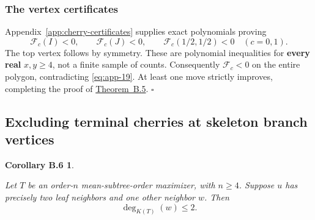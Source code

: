 \documentclass[11pt,reqno]{amsart}
\theoremstyle{plain}
\newtheorem*{appcorollarysix}{Corollary B.6}
\begin{document}
\subsubsection*{The vertex certificates}\label{the-vertex-certificates}

Appendix~\ref{app:cherry-certificates} supplies exact polynomials proving \[
\mathcal F_c(I)<0,\qquad
\mathcal F_c(J)<0,\qquad
\mathcal F_c(1/2,1/2)<0
\quad(c=0,1).
\tag{B.25}\label{eq:app-25}
\] The top vertex follows by symmetry. These are polynomial inequalities for \textbf{every real} \(x,y\ge4\), not a finite sample of counts. Consequently \(\mathcal F_c<0\) on the entire polygon, contradicting \eqref{eq:app-19}. At least one move strictly improves, completing the proof of \hyperref[thm:app-5]{Theorem~B.5}. \hfill\(\square\)

\subsection{Excluding terminal cherries at skeleton branch vertices}\label{b.5.-excluding-terminal-cherries-at-skeleton-branch-vertices}

\begin{appcorollarysix}\label{cor:app-6}

Let \(T\) be an order-\(n\) mean-subtree-order maximizer, with \(n\ge4\). Suppose \(u\) has precisely two leaf neighbors and one other neighbor \(w\). Then \[
\boxed{\deg_{K(T)}(w)\le2.}
\tag{B.26}\label{eq:app-26}
\]

\end{appcorollarysix}
\end{document}
